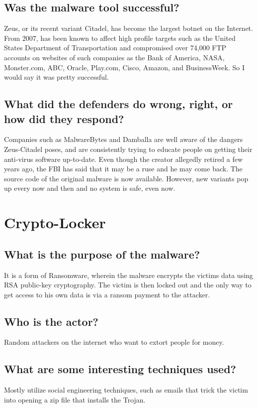 \documentclass{llncs}
\begin{document}
\subsection{Was the malware tool successful?}
Zeus, or its recent variant Citadel, has become the largest botnet on the Internet. From 2007, has been known to affect high profile targets such as the United States Department of Transportation and compromised over 74,000 FTP accounts on websites of such companies as the Bank of America, NASA, Monster.com, ABC, Oracle, Play.com, Cisco, Amazon, and BusinessWeek. So I would say it was pretty successful. 
\subsection{What did the defenders do wrong, right, or how did they respond?}
Companies such as MalwareBytes and Damballa are well aware of the dangers Zeus-Citadel poses, and are consistently trying to educate people on getting their anti-virus software up-to-date. Even though the creator allegedly retired a few years ago, the FBI has said that it may be a ruse and he may come back. The source code of the original malware is now available. However, new variants pop up every now and then and no system is safe, even now. 

\section{Crypto-Locker}

\subsection{What is the purpose of the malware?}
It is a form of Ransomware, wherein the malware encrypts the victims data using RSA public-key cryptography. The victim is then locked out and the only way to get access to his own data is via a ransom payment to the attacker.
\subsection{Who is the actor?}
Random attackers on the internet who want to extort people for money. 
\subsection{What are some interesting techniques used?}
Mostly utilize social engineering techniques, such as emails that trick the victim into opening a zip file that installs the Trojan.
\end{document}
